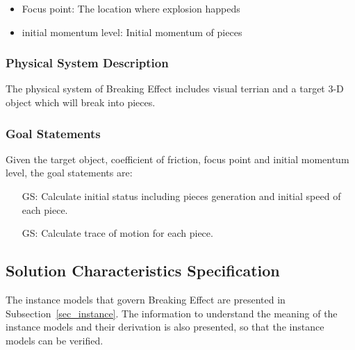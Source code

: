\documentclass[12pt]{article}
\newcounter{goalnum} %
\newcommand{\progname}{Breaking Effect} %
\begin{document}
\begin{itemize}

\item Focus point: The location where explosion happeds 
\item initial momentum level: Initial momentum of pieces  

\end{itemize}

\subsubsection{Physical System Description}

The physical system of \progname{} includes visual terrian  and a target 3-D object which will break into pieces.


\subsubsection{Goal Statements}

\noindent Given the target object, coefficient of friction, focus point and initial momentum level, the goal statements are:

\begin{itemize}

\item[GS\refstepcounter{goalnum}\thegoalnum \label{G_speed}:] Calculate initial status including pieces generation and initial speed of each piece.​

\item[GS\refstepcounter{goalnum}\thegoalnum \label{G_motion}:] Calculate trace of motion for each piece.

\end{itemize}

\subsection{Solution Characteristics Specification}

The instance models that govern \progname{} are presented in
Subsection~\ref{sec_instance}.  The information to understand the meaning of the
instance models and their derivation is also presented, so that the instance
models can be verified.
\end{document}
